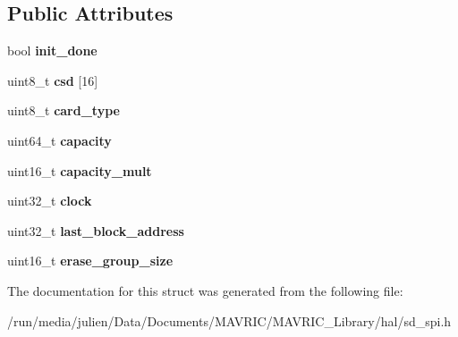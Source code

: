 \subsection*{Public Attributes}
\begin{DoxyCompactItemize}
\item 
\hypertarget{structsd__spi__t_a4fcec872bef23282f9479756eb4e5b1b}{bool {\bfseries init\+\_\+done}}\label{structsd__spi__t_a4fcec872bef23282f9479756eb4e5b1b}

\item 
\hypertarget{structsd__spi__t_a8b32a506ae26d49fb930d35ff47b50b2}{uint8\+\_\+t {\bfseries csd} \mbox{[}16\mbox{]}}\label{structsd__spi__t_a8b32a506ae26d49fb930d35ff47b50b2}

\item 
\hypertarget{structsd__spi__t_a1e3ff5e74b98887358082c91c331e512}{uint8\+\_\+t {\bfseries card\+\_\+type}}\label{structsd__spi__t_a1e3ff5e74b98887358082c91c331e512}

\item 
\hypertarget{structsd__spi__t_a4bab21719e81c2cae1d553d17255631c}{uint64\+\_\+t {\bfseries capacity}}\label{structsd__spi__t_a4bab21719e81c2cae1d553d17255631c}

\item 
\hypertarget{structsd__spi__t_a262b022411f1f6838f513ae91d5627cc}{uint16\+\_\+t {\bfseries capacity\+\_\+mult}}\label{structsd__spi__t_a262b022411f1f6838f513ae91d5627cc}

\item 
\hypertarget{structsd__spi__t_a0045b83e9e6b535f40a5df160f76370c}{uint32\+\_\+t {\bfseries clock}}\label{structsd__spi__t_a0045b83e9e6b535f40a5df160f76370c}

\item 
\hypertarget{structsd__spi__t_a94e79a0d9f35854e754d05389cb63f9f}{uint32\+\_\+t {\bfseries last\+\_\+block\+\_\+address}}\label{structsd__spi__t_a94e79a0d9f35854e754d05389cb63f9f}

\item 
\hypertarget{structsd__spi__t_a43e1b4534aa5af64389d99d254566211}{uint16\+\_\+t {\bfseries erase\+\_\+group\+\_\+size}}\label{structsd__spi__t_a43e1b4534aa5af64389d99d254566211}

\end{DoxyCompactItemize}


The documentation for this struct was generated from the following file\+:\begin{DoxyCompactItemize}
\item 
/run/media/julien/\+Data/\+Documents/\+M\+A\+V\+R\+I\+C/\+M\+A\+V\+R\+I\+C\+\_\+\+Library/hal/sd\+\_\+spi.\+h\end{DoxyCompactItemize}
